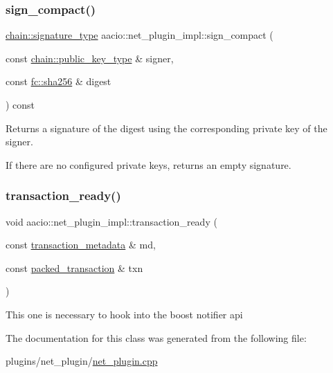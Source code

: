 \subsubsection{\texorpdfstring{sign\+\_\+compact()}{sign\_compact()}}
{\footnotesize\ttfamily \mbox{\hyperlink{classfc_1_1crypto_1_1signature}{chain\+::signature\+\_\+type}} aacio\+::net\+\_\+plugin\+\_\+impl\+::sign\+\_\+compact (\begin{DoxyParamCaption}\item[{const \mbox{\hyperlink{classfc_1_1crypto_1_1public__key}{chain\+::public\+\_\+key\+\_\+type}} \&}]{signer,  }\item[{const \mbox{\hyperlink{classfc_1_1sha256}{fc\+::sha256}} \&}]{digest }\end{DoxyParamCaption}) const}



Returns a signature of the digest using the corresponding private key of the signer. 

If there are no configured private keys, returns an empty signature. \mbox{\label{classaacio_1_1net__plugin__impl_a0ca5abb05defea1895bb63afaae7a4a9}} 
\subsubsection{\texorpdfstring{transaction\+\_\+ready()}{transaction\_ready()}}
{\footnotesize\ttfamily void aacio\+::net\+\_\+plugin\+\_\+impl\+::transaction\+\_\+ready (\begin{DoxyParamCaption}\item[{const \mbox{\hyperlink{classaacio_1_1chain_1_1transaction__metadata}{transaction\+\_\+metadata}} \&}]{md,  }\item[{const \mbox{\hyperlink{structaacio_1_1chain_1_1packed__transaction}{packed\+\_\+transaction}} \&}]{txn }\end{DoxyParamCaption})\hspace{0.3cm}{\ttfamily [static]}}

This one is necessary to hook into the boost notifier api 

The documentation for this class was generated from the following file\+:\begin{DoxyCompactItemize}
\item 
plugins/net\+\_\+plugin/\mbox{\hyperlink{net__plugin_8cpp}{net\+\_\+plugin.\+cpp}}\end{DoxyCompactItemize}
